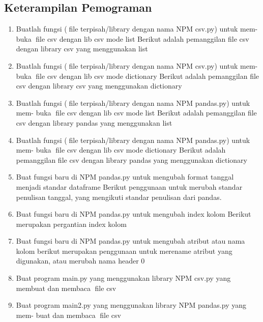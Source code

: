  \subsection{Keterampilan Pemograman}
\begin{enumerate}
    \item Buatlah fungsi (file terpisah/library dengan nama NPM csv.py) untuk mem-
    buka file csv dengan lib csv mode list
    Berikut adalah pemanggilan file csv dengan library csv yang menggunakan list
    

    \item Buatlah fungsi (file terpisah/library dengan nama NPM csv.py) untuk mem-
    buka file csv dengan lib csv mode dictionary
    Berikut adalah pemanggilan file csv dengan library csv yang menggunakan dictionary
    

    \item Buatlah fungsi (file terpisah/library dengan nama NPM pandas.py) untuk mem-
    buka file csv dengan lib csv mode list
    Berikut adalah pemanggilan file csv dengan library pandas yang menggunakan list
    

    \item Buatlah fungsi (file terpisah/library dengan nama NPM pandas.py) untuk mem-
    buka file csv dengan lib csv mode dictionary
    Berikut adalah pemanggilan file csv dengan library pandas yang menggunakan dictionary
    

    \item Buat fungsi baru di NPM pandas.py untuk mengubah format tanggal menjadi
    standar dataframe
    Berikut penggunaan untuk merubah standar penulisan tanggal, yang mengikuti standar penulisan dari pandas.
    

    \item Buat fungsi baru di NPM pandas.py untuk mengubah index kolom
    Berikut merupakan pergantian index kolom
    

    \item Buat fungsi baru di NPM pandas.py untuk mengubah atribut atau nama kolom
    berikut merupakan penggunaan untuk merename atribut yang digunakan, atau merubah nama header 0
    

    \item Buat program main.py yang menggunakan library NPM csv.py yang membuat
    dan membaca file csv
    

    \item Buat program main2.py yang menggunakan library NPM pandas.py yang mem-
    buat dan membaca file csv
    
\end{enumerate}